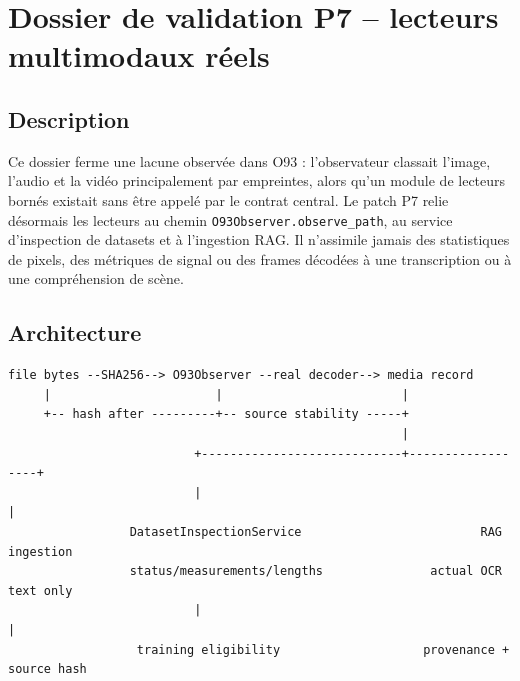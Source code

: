 \documentclass[11pt,a4paper]{report}
\begin{document}
\chapter{Dossier de validation P7 -- lecteurs multimodaux réels}
\section{Description}
Ce dossier ferme une lacune observée dans O93 : l'observateur classait l'image, l'audio et la vidéo principalement par empreintes, alors qu'un module de lecteurs bornés existait sans être appelé par le contrat central. Le patch P7 relie désormais les lecteurs au chemin \texttt{O93Observer.observe\_path}, au service d'inspection de datasets et à l'ingestion RAG. Il n'assimile jamais des statistiques de pixels, des métriques de signal ou des frames décodées à une transcription ou à une compréhension de scène.
\section{Architecture}
\begin{lstlisting}
file bytes --SHA256--> O93Observer --real decoder--> media record
     |                       |                         |
     +-- hash after ---------+-- source stability -----+
                                                       |
                          +----------------------------+------------------+
                          |                                               |
                 DatasetInspectionService                         RAG ingestion
                 status/measurements/lengths               actual OCR text only
                          |                                               |
                  training eligibility                    provenance + source hash
\end{lstlisting}
\end{document}
